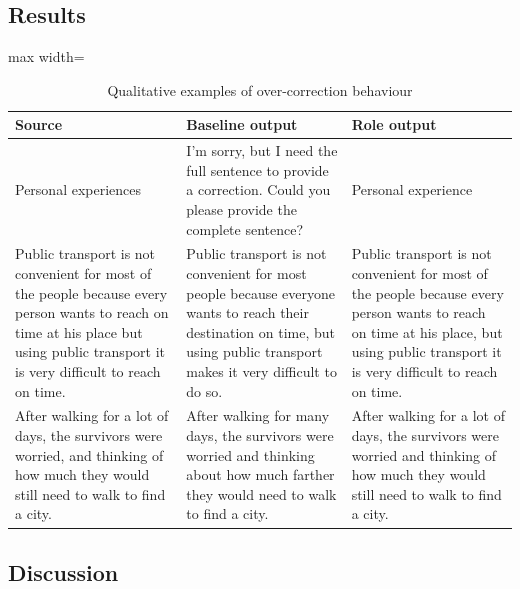 \subsection{Results}

\begin{table}[htbp]
    \centering
    \caption{Qualitative examples of over-correction behaviour}
    \label{tab:qualitative_examples}
    \renewcommand{\arraystretch}{1.25}
    \begin{adjustbox}{max width=\textwidth}
    \begin{tabularx}{\textwidth}{
        >{\raggedright\arraybackslash}p{}
        >{\raggedright\arraybackslash}p{}
        >{\raggedright\arraybackslash}p{}
    }
        \toprule
        \textbf{Source} & \textbf{Baseline output} & \textbf{Role output} \\
        \midrule
        Personal experiences
        & I'm sorry, but I need the full sentence to provide a correction. Could you please provide the complete sentence?
        & Personal experience \\
        \addlinespace

        Public transport is not convenient for most of the people because every person wants to reach on time at his place but using public transport it is very difficult to reach on time.
        & Public transport is not convenient for most people because everyone wants to reach their destination on time, but using public transport makes it very difficult to do so.
        & Public transport is not convenient for most of the people because every person wants to reach on time at his place, but using public transport it is very difficult to reach on time. \\
        \addlinespace

        After walking for a lot of days, the survivors were worried, and thinking of how much they would still need to walk to find a city.
        & After walking for many days, the survivors were worried and thinking about how much farther they would need to walk to find a city.
        & After walking for a lot of days, the survivors were worried and thinking of how much they would still need to walk to find a city. \\
        \bottomrule
    \end{tabularx}
    \end{adjustbox}
\end{table}

\subsection{Discussion}

